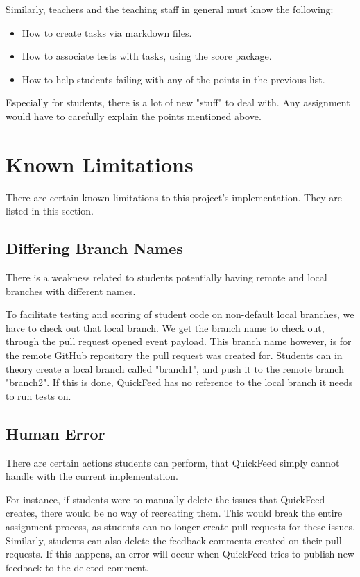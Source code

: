 Similarly, teachers and the teaching staff in general must know the following:
\begin{itemize}
    \item How to create tasks via markdown files.
    \item How to associate tests with tasks, using the score package.
    \item How to help students failing with any of the points in the previous list.
\end{itemize}

Especially for students, there is a lot of new "stuff" to deal with.
Any assignment would have to carefully explain the points mentioned above.

\section{Known Limitations}

There are certain known limitations to this project's implementation.
They are listed in this section.

\subsection{Differing Branch Names}

There is a weakness related to students potentially having remote and local branches with different names.

To facilitate testing and scoring of student code on non-default local branches, we have to check out that local branch.
We get the branch name to check out, through the pull request opened event payload.
This branch name however, is for the remote GitHub repository the pull request was created for.
Students can in theory create a local branch called "branch1", and push it to the remote branch "branch2".
If this is done, QuickFeed has no reference to the local branch it needs to run tests on.

\subsection{Human Error}

There are certain actions students can perform, that QuickFeed simply cannot handle with the current implementation.

For instance, if students were to manually delete the issues that QuickFeed creates, there would be no way of recreating them.
This would break the entire assignment process, as students can no longer create pull requests for these issues.
Similarly, students can also delete the feedback comments created on their pull requests.
If this happens, an error will occur when QuickFeed tries to publish new feedback to the deleted comment.

